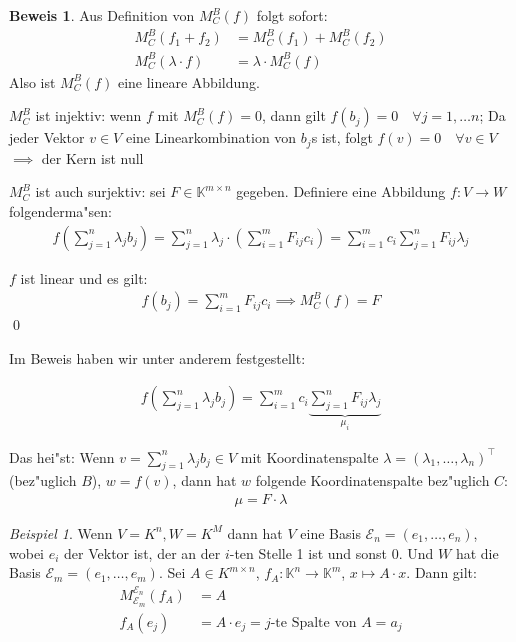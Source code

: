 \documentclass[11pt]{article}
\theoremstyle{remark}
\newtheorem{exa}{Beispiel}[section]
\theoremstyle{definition}
\newtheorem{prof}{Beweis}
\theoremstyle{remark}
\begin{document}
\begin{prof}
Aus Definition von \(M_C^B(f)\) folgt sofort:
\begin{align*}
M^B_C(f_1 + f_2) &= M_C^B(f_1) + M_C^B(f_2)\\
M^B_C(\lambda\cdot f) &= \lambda\cdot M_C^B(f)
\end{align*}
Also ist \(M_C^B(f)\) eine lineare
Abbildung.

\(M_C^B\) ist injektiv: wenn \(f\) mit \(M^B_C(f) = 0\), dann gilt \(f(b_j) = 0\quad\forall j= 1,\dots n\); Da jeder Vektor \(v \in V\) eine Linearkombination von \(b_j\)s ist, folgt \(f(v) = 0 \quad\forall v \in V\) \(\implies\) der Kern ist null

\(M^B_C\) ist auch surjektiv: sei \(F\in \mathbb{K}^{m\times n}\) gegeben. Definiere eine Abbildung \(f: V\to W\) folgenderma"sen:
\begin{align*}
f\left(\sum_{j=1}^n\lambda_jb_j\right) = \sum_{j=1}^n\lambda_j\cdot\left(\sum_{i=1}^mF_{ij}c_i\right)=\sum_{i=1}^mc_i\sum_{j=1}^nF_{ij}\lambda_j
\end{align*}

\(f\) ist linear und es gilt:
\begin{align*}
f(b_j) = \sum_{i=1}^mF_{ij}c_i \implies M^B_C(f) = F
\end{align*}\qed
\end{prof}

Im Beweis haben wir unter anderem festgestellt:
\begin{relation}
\begin{align*}
f\left(\sum_{j=1}^n\lambda_jb_j\right)=\sum_{i=1}^mc_i\underbrace{\sum_{j=1}^nF_{ij}\lambda_j}_{\mu_i}
\end{align*}

Das hei"st: Wenn \(v=\sum_{j=1}^n\lambda_jb_j\in V\) mit Koordinatenspalte \(\lambda = (\lambda_1,\dots,\lambda_n)^\top\) (bez"uglich \(B\)), \(w = f(v)\), dann hat \(w\) folgende Koordinatenspalte bez"uglich \(C\):
\begin{align}
\mu = F\cdot \lambda
\end{align}
\end{relation}

\begin{exa}
Wenn \(V=K^n, W=K^M\) dann hat \(V\) eine Basis \(\mathcal{E}_n = (e_1, \dots, e_n)\), wobei \(e_i\) der Vektor ist, der an der \(i\)-ten Stelle 1 ist und sonst 0. Und \(W\) hat die Basis \(\mathcal{E}_m = (e_1, \dots, e_m)\).
Sei \(A\in K^{m\times n }\), \(f_A: \mathbb{K}^n\to \mathbb{K}^m\), \(x \mapsto A\cdot x\). Dann gilt:
\begin{align*}
M^{\mathcal{E}_n}_{\mathcal{E}_m}(f_A) &= A\\
f_A(e_j) &= A\cdot e_j = j\text{-te Spalte von } A = a_j
\end{align*}
\end{exa}
\end{document}
